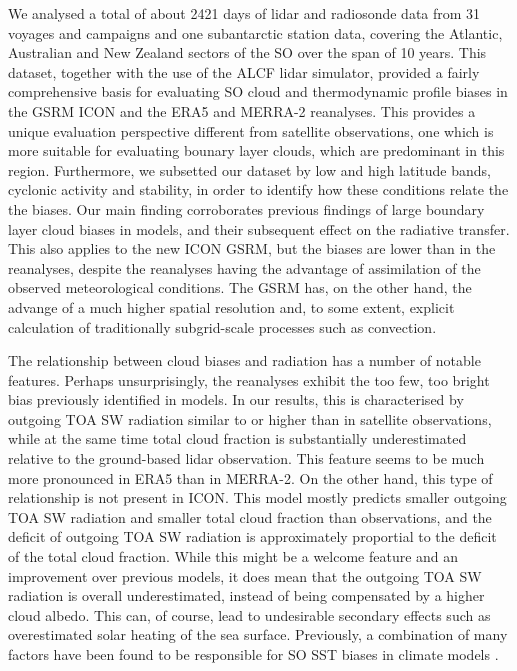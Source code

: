 \documentclass[12pt,a4paper]{article}
\begin{document}
We analysed a total of about 2421 days of lidar and radiosonde data from 31
voyages and campaigns and one subantarctic station data, covering the Atlantic,
Australian and New Zealand sectors of the SO over the span of 10 years. This
dataset, together with the use of the ALCF lidar simulator, provided a fairly
comprehensive basis for evaluating SO cloud and thermodynamic profile biases in
the GSRM ICON and the ERA5 and MERRA-2 reanalyses. This provides a unique
evaluation perspective different from satellite observations, one which is more
suitable for evaluating bounary layer clouds, which are predominant in this
region. Furthermore, we subsetted our dataset by low and high latitude bands,
cyclonic activity and stability, in order to identify how these conditions
relate the the biases. Our main finding corroborates previous findings of large
boundary layer cloud biases in models, and their subsequent effect on the
radiative transfer. This also applies to the new ICON GSRM, but the biases are
lower than in the reanalyses, despite the reanalyses having the advantage of
assimilation of the observed meteorological conditions.  The GSRM has, on the
other hand, the advange of a much higher spatial resolution and, to some
extent, explicit calculation of traditionally subgrid-scale processes such as
convection.

The relationship between cloud biases and radiation has a number of notable
features. Perhaps unsurprisingly, the reanalyses exhibit the too few, too
bright bias previously identified in models. In our results, this is
characterised by outgoing TOA SW radiation similar to or higher than in
satellite observations, while at the same time total cloud fraction is
substantially underestimated relative to the ground-based lidar observation.
This feature seems to be much more pronounced in ERA5 than in MERRA-2. On the
other hand, this type of relationship is not present in ICON. This model mostly
predicts smaller outgoing TOA SW radiation and smaller total cloud fraction
than observations, and the deficit of outgoing TOA SW radiation is
approximately proportial to the deficit of the total cloud fraction. While this
might be a welcome feature and an improvement over previous models, it does
mean that the outgoing TOA SW radiation is overall underestimated, instead of
being compensated by a higher cloud albedo. This can, of course, lead to
undesirable secondary effects such as overestimated solar heating of the sea
surface. Previously, a combination of many factors have been found to be
responsible for SO SST biases in climate models \citep{zhang2023,luo2023}.
\end{document}
